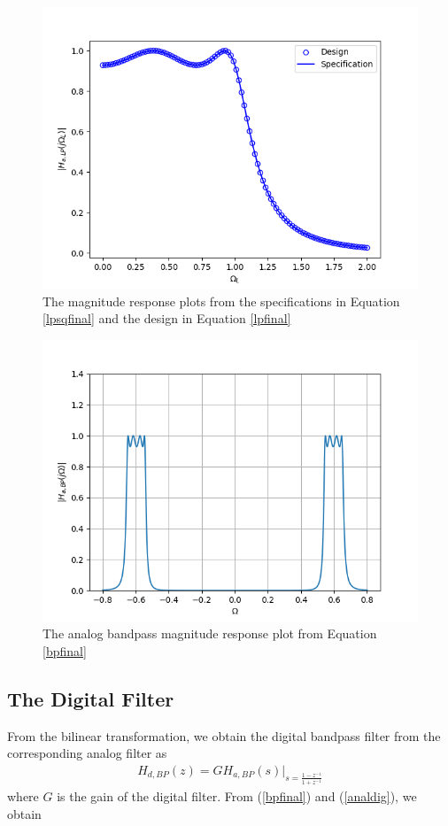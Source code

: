 \documentclass{article}
\begin{document}
\begin{figure}
\label{fig2}
\includegraphics[width = 15cm]{figs/figure2.png}
\caption{The magnitude response plots from the specifications in Equation \ref{lpsqfinal} and the design in Equation \ref{lpfinal}}
\end{figure}

\begin{figure}
\label{fig3}
\includegraphics[width = 15cm]{figs/figure3.png}
\caption{The analog bandpass magnitude response plot from Equation \ref{bpfinal}} 
\end{figure}

\subsection{The Digital Filter}
From the bilinear transformation, we obtain the digital bandpass filter from the corresponding analog filter as
\begin{eqnarray}
\label{analdig}
H_{d,BP}(z) = GH_{a,BP}(s)\vert_{s = \frac{1-z^{-1}}{1 + z^{-1}}}
\end{eqnarray}
where $G$ is the gain of the digital filter.  From (\ref{bpfinal}) and (\ref{analdig}), we obtain
\end{document}
